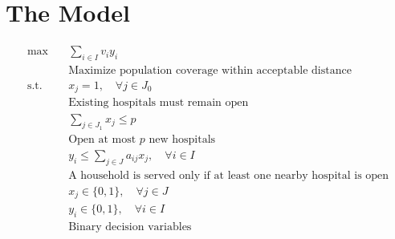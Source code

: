 \documentclass{article}
\begin{document}
\section{The Model}
\begin{align*}
    \max \quad & \sum_{i \in I} v_i y_i \\
    & \text{Maximize population coverage within acceptable distance} \\[6pt]
    \text{s.t.} \quad & x_j = 1, \quad \forall j \in J_0 \\
    & \text{Existing hospitals must remain open} \\[6pt]
    & \sum_{j \in J_1} x_j \leq p \\
    & \text{Open at most } p \text{ new hospitals} \\[6pt]
    & y_i \leq \sum_{j \in J } a_{ij} x_j, \quad \forall i \in I \\
    & \text{A household is served only if at least one nearby hospital is open} \\[6pt]
    & x_j \in \{0,1\}, \quad \forall j \in J \\
    & y_i \in \{0,1\}, \quad \forall i \in I \\
    & \text{Binary decision variables}
\end{align*}
\end{document}
